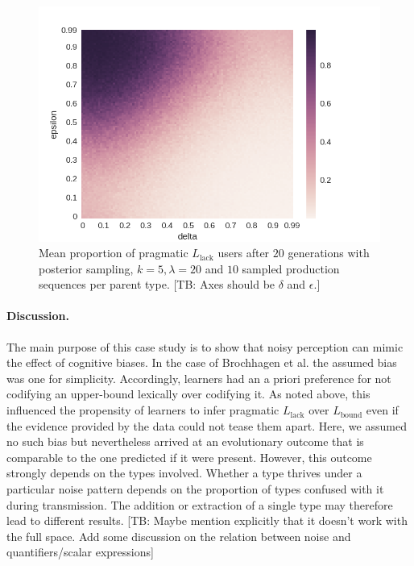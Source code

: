\documentclass[10pt,a4paper]{article}
\newcommand{\tb}[1]{\textcolor[rgb]{.8,.33,.0}{[TB: #1]}}%
\begin{document}
\begin{figure}[ht]
\centering
    \includegraphics[scale=0.5]{../code/plots/quantifiers-posterior-sampling-k5.png}
  \caption{Mean proportion of pragmatic $L_{\text{lack}}$ users after $20$ generations with posterior sampling, $k = 5, \lambda = 20$ and $10$ sampled production sequences per parent type. \tb{Axes should be $\delta$ and $\epsilon$.}}
  \label{fig:quant}
\end{figure}


\paragraph{Discussion.} The main purpose of this case study is to show that noisy perception can mimic the effect of cognitive biases. In the case of Brochhagen et al. the assumed bias was one for simplicity. Accordingly, learners had an a priori preference for not codifying an upper-bound lexically over codifying it. As noted above, this influenced the propensity of learners to infer pragmatic $L_{\text{lack}}$ over $L_{\text{bound}}$ even if the evidence provided by the data could not tease them apart. Here, we assumed no such bias but nevertheless arrived at an evolutionary outcome that is comparable to the one predicted if it were present. However, this outcome strongly depends on the types involved. Whether a type thrives under a particular noise pattern depends on the proportion of types confused with it during transmission. The addition or extraction of a single type may therefore lead to different results. \tb{Maybe mention explicitly that it doesn't work with the full space. Add some discussion on the relation between noise and quantifiers/scalar expressions}
\end{document}
